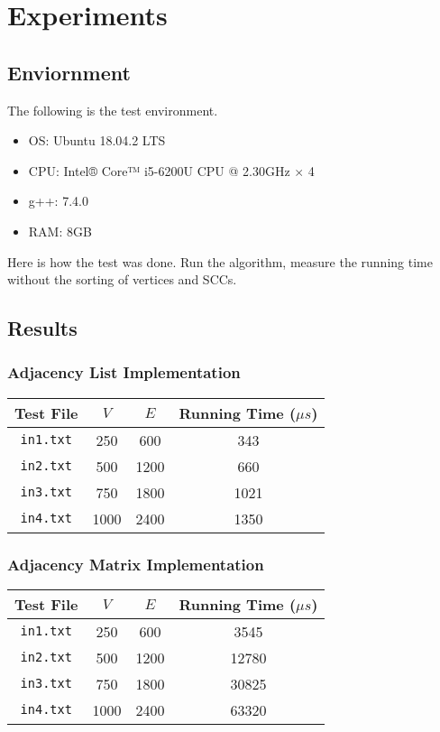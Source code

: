 \documentclass[12pt]{article}
\begin{document}
\section{Experiments}
\subsection{Enviornment}
The following is the test environment.
\begin{itemize}
	\item OS: Ubuntu 18.04.2 LTS
	\item CPU: Intel® Core™ i5-6200U CPU @ 2.30GHz $\times$ 4
	\item g++: 7.4.0
	\item RAM: 8GB  
\end{itemize} 
Here is how the test was done. Run the algorithm, measure the running time without the sorting of vertices and SCCs.

\subsection{Results}
\subsubsection{Adjacency List Implementation}
\begin{center}
	\begin{tabular}{|c|c|c|c|}
		\hline
		Test File & $V$ & $E$ & Running Time ($\mu s$) \\ \hline
		\texttt{in1.txt} & 250 & 600 & 343\\ \hline 
		\texttt{in2.txt} & 500 & 1200 & 660 \\ \hline 
		\texttt{in3.txt} & 750 & 1800 & 1021 \\ \hline 
		\texttt{in4.txt} & 1000 & 2400 & 1350 \\ \hline 
	\end{tabular}
\end{center}

\subsubsection{Adjacency Matrix Implementation}
\begin{center}
	\begin{tabular}{|c|c|c|c|}
		\hline
		Test File & $V$ & $E$ & Running Time ($\mu s$) \\ \hline
		\texttt{in1.txt} & 250 & 600 & 3545\\ \hline 
		\texttt{in2.txt} & 500 & 1200 & 12780 \\ \hline 
		\texttt{in3.txt} & 750 & 1800 & 30825 \\ \hline 
		\texttt{in4.txt} & 1000 & 2400 & 63320 \\ \hline 
	\end{tabular}
\end{center}
\end{document}
